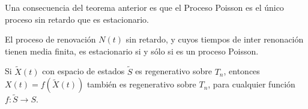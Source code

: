 \begin{Note}
Una consecuencia del teorema anterior es que el Proceso Poisson es el \'unico proceso sin retardo que es estacionario.
\end{Note}

\begin{Coro}
El proceso de renovaci\'on $N\left(t\right)$ sin retardo, y cuyos tiempos de inter renonaci\'on tienen media finita, es estacionario si y s\'olo si es un proceso Poisson.

\end{Coro}






\begin{Note}
Si $\tilde{X}\left(t\right)$ con espacio de estados $\tilde{S}$ es regenerativo sobre $T_{n}$, entonces $X\left(t\right)=f\left(\tilde{X}\left(t\right)\right)$ tambi\'en es regenerativo sobre $T_{n}$, para cualquier funci\'on $f:\tilde{S}\rightarrow S$.
\end{Note}

